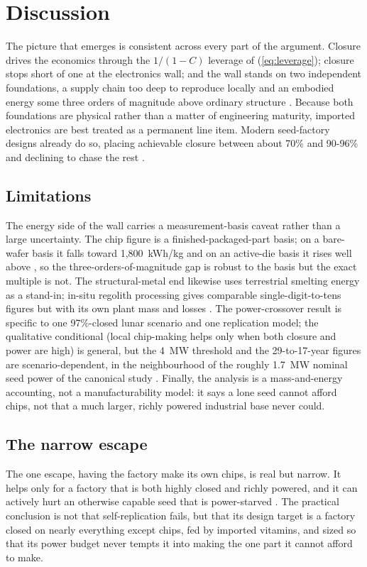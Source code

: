 \section{Discussion}

The picture that emerges is consistent across every part of the argument. Closure drives
the economics through the $1/(1-C)$ leverage of (\ref{eq:leverage}); closure stops short of
one at the electronics wall; and the wall stands on two independent foundations, a supply
chain too deep to reproduce locally \cite{csis-semiconductor-supply-chain} and an embodied
energy some three orders of magnitude above ordinary structure
\cite{williams-ayres-heller-2002,gutowski-2009}. Because both foundations are physical
rather than a matter of engineering maturity, imported electronics are best treated as a
permanent line item. Modern seed-factory designs already do so, placing achievable closure
between about 70\% and \mbox{90-96\%} and declining to chase the rest
\cite{nasa-cp-2255-1980,guided-self-replicating-factory-2021,freitas-merkle-2004}.

\subsection{Limitations}
The energy side of the wall carries a measurement-basis caveat rather than a large
uncertainty. The chip figure is a finished-packaged-part basis; on a bare-wafer basis it
falls toward 1{,}800~kWh/kg and on an active-die basis it rises well above
\cite{murphy-2003,boyd-2012}, so the three-orders-of-magnitude gap is robust to the basis
but the exact multiple is not. The structural-metal end likewise uses terrestrial smelting
energy as a stand-in; in-situ regolith processing gives comparable single-digit-to-tens
figures but with its own plant mass and losses \cite{guerrero-zabel-2023}. The power-crossover
result is specific to one 97\%-closed lunar scenario and one replication model; the
qualitative conditional (local chip-making helps only when both closure and power are high)
is general, but the 4~MW threshold and the 29-to-17-year figures are scenario-dependent, in
the neighbourhood of the roughly 1.7~MW nominal seed power of the canonical study
\cite{nasa-cp-2255-1980}. Finally, the analysis is a mass-and-energy accounting, not a
manufacturability model: it says a lone seed cannot afford chips, not that a much larger,
richly powered industrial base never could.

\subsection{The narrow escape}
The one escape, having the factory make its own chips, is real but narrow. It helps only
for a factory that is both highly closed and richly powered, and it can actively hurt an
otherwise capable seed that is power-starved \cite{nasa-cp-2255-1980}. The practical
conclusion is not that self-replication fails, but that its design target is a factory
closed on nearly everything except chips, fed by imported vitamins, and sized so that its
power budget never tempts it into making the one part it cannot afford to make.
